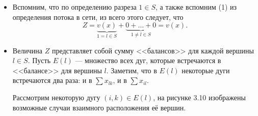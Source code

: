 \begin{itemize}[nosep]
	\item[\fbox{1}] Вспомним, что по определению разреза $1 \in S$, а также вспомним (1) из определения потока в сети, из всего этого следует, что
	\[
	Z = \underbrace{v(x)}_{1 = l \in S} + \underbrace{0 + \dots + 0}_{1 \neq l \in S} = v(x).
	\]
	
	\item[\fbox{2}] Величина $Z$ представляет собой сумму <<балансов>> для каждой вершины $l \in S$. Пусть $E(l)$ --- множество всех дуг, которые встречаются в <<балансе>> для вершины $l$. Заметим, что в $E(l)$ некоторые дуги встречаются два раза: и в $\sum x_{lk}$, и в $\sum {x_{il}}$.
	
	Рассмотрим некоторую дугу $(i, k) \in E(l)$, на рисунке 3.10 изображены возможные случаи взаимного расположения её вершин.
	

\end{itemize}
